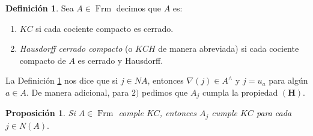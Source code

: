 \documentclass[11pt]{amsart}
\DeclareMathOperator{\Frm}{Frm}
\theoremstyle{plain}
\newtheorem{prop}[thm]{Proposición}
\theoremstyle{definition}
\newtheorem{dfn}[thm]{Definición}
\begin{document}
%

    

\begin{dfn}\label{KC y KCH}
Sea $A\in \Frm$ decimos que $A$ es:
\begin{enumerate}
    \item $KC$ si cada cociente compacto es cerrado.

    \item \emph{Hausdorff cerrado compacto} (o $KCH$ de manera abreviada) si cada cociente compacto de $A$ es cerrado y Hausdorff.
\end{enumerate}
\end{dfn}

La Definición \ref{KC y KCH} nos dice que si $j\in NA$, entonces $\nabla(j)\in A^\wedge$ y $j=u_a$ para algún $a\in A$. De manera adicional, para $2)$ pedimos que $A_j$ cumpla la propiedad $\mathbf{(H)}$.\\

\begin{prop}\label{KCquout}
    Si $A\in \Frm$ comple $KC$, entonces $A_j$ cumple $KC$ para cada $j\in N(A).$
\end{prop}
\end{document}
